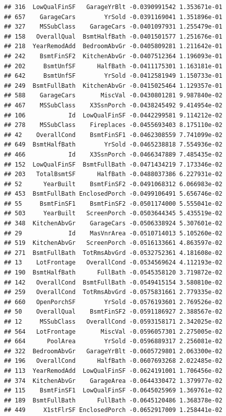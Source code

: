 \documentclass[american,]{article}
\theoremstyle{definition}
\theoremstyle{definition}
\theoremstyle{definition}
\theoremstyle{remark}
\begin{document}
\begin{verbatim}
## 316  LowQualFinSF   GarageYrBlt -0.0390991542 1.353671e-01
## 657    GarageCars        YrSold -0.0391169041 1.351896e-01
## 327    MSSubClass    GarageCars -0.0401097931 1.255479e-01
## 158   OverallQual  BsmtHalfBath -0.0401501577 1.251676e-01
## 218  YearRemodAdd  BedroomAbvGr -0.0405809281 1.211642e-01
## 242    BsmtFinSF2  KitchenAbvGr -0.0407512364 1.196093e-01
## 202     BsmtUnfSF      HalfBath -0.0411175301 1.163181e-01
## 642     BsmtUnfSF        YrSold -0.0412581949 1.150733e-01
## 249  BsmtFullBath  KitchenAbvGr -0.0415025464 1.129357e-01
## 588    GarageCars       MiscVal -0.0430801281 9.987840e-02
## 467    MSSubClass    X3SsnPorch -0.0438245492 9.414954e-02
## 106            Id  LowQualFinSF -0.0442299581 9.114212e-02
## 278    MSSubClass    Fireplaces -0.0455693403 8.175110e-02
## 42    OverallCond    BsmtFinSF1 -0.0462308559 7.741099e-02
## 649  BsmtHalfBath        YrSold -0.0465238818 7.554936e-02
## 466            Id    X3SsnPorch -0.0466347889 7.485435e-02
## 152  LowQualFinSF  BsmtFullBath -0.0471434219 7.173346e-02
## 203   TotalBsmtSF      HalfBath -0.0488037386 6.227931e-02
## 52      YearBuilt    BsmtFinSF2 -0.0491068312 6.066983e-02
## 453  BsmtFullBath EnclosedPorch -0.0499106491 5.656746e-02
## 55     BsmtFinSF1    BsmtFinSF2 -0.0501174000 5.555041e-02
## 503     YearBuilt   ScreenPorch -0.0503644345 5.435519e-02
## 348  KitchenAbvGr    GarageCars -0.0506338924 5.307601e-02
## 29             Id    MasVnrArea -0.0510714013 5.105260e-02
## 519  KitchenAbvGr   ScreenPorch -0.0516133661 4.863597e-02
## 271  BsmtFullBath  TotRmsAbvGrd -0.0532752361 4.181608e-02
## 13    LotFrontage   OverallCond -0.0534569624 4.112193e-02
## 190  BsmtHalfBath      FullBath -0.0545358120 3.719872e-02
## 142   OverallCond  BsmtFullBath -0.0549415154 3.580810e-02
## 259   OverallCond  TotRmsAbvGrd -0.0575831661 2.779335e-02
## 660   OpenPorchSF        YrSold -0.0576193601 2.769526e-02
## 50    OverallQual    BsmtFinSF2 -0.0591186927 2.388567e-02
## 12     MSSubClass   OverallCond -0.0593158171 2.342025e-02
## 564   LotFrontage       MiscVal -0.0596057301 2.275005e-02
## 664      PoolArea        YrSold -0.0596889317 2.256081e-02
## 322  BedroomAbvGr   GarageYrBlt -0.0605729801 2.063300e-02
## 196   OverallCond      HalfBath -0.0607693268 2.022485e-02
## 113  YearRemodAdd  LowQualFinSF -0.0624191001 1.706456e-02
## 374  KitchenAbvGr    GarageArea -0.0644330472 1.379977e-02
## 115    BsmtFinSF1  LowQualFinSF -0.0645025969 1.369761e-02
## 189  BsmtFullBath      FullBath -0.0645120486 1.368378e-02
## 449     X1stFlrSF EnclosedPorch -0.0652917009 1.258441e-02

\end{verbatim}
\end{document}
